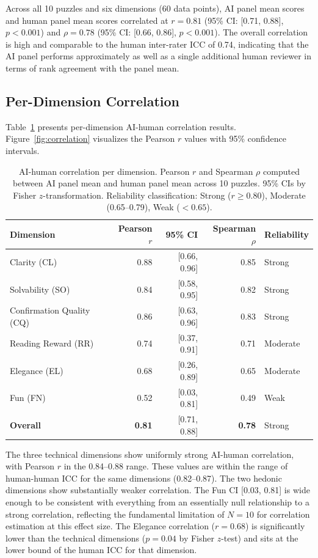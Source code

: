 Across all 10 puzzles and six dimensions (60 data points), AI panel mean scores and human panel mean scores correlated at $r = 0.81$ (95\% CI: [0.71, 0.88], $p < 0.001$) and $\rho = 0.78$ (95\% CI: [0.66, 0.86], $p < 0.001$). The overall correlation is high and comparable to the human inter-rater ICC of 0.74, indicating that the AI panel performs approximately as well as a single additional human reviewer in terms of rank agreement with the panel mean.

\subsection{Per-Dimension Correlation}

Table~\ref{tab:corr} presents per-dimension AI-human correlation results. Figure~\ref{fig:correlation} visualizes the Pearson $r$ values with 95\% confidence intervals.

\begin{table}[htbp]
\centering
\caption{AI-human correlation per dimension. Pearson $r$ and Spearman $\rho$ computed between AI panel mean and human panel mean across 10 puzzles. 95\% CIs by Fisher $z$-transformation. Reliability classification: Strong ($r \geq 0.80$), Moderate (0.65--0.79), Weak ($< 0.65$).}
\label{tab:corr}
\begin{tabular}{@{}lrrrl@{}}
\toprule
\textbf{Dimension} & \textbf{Pearson $r$} & \textbf{95\% CI} & \textbf{Spearman $\rho$} & \textbf{Reliability} \\
\midrule
Clarity (CL)              & 0.88 & [0.66, 0.96] & 0.85 & Strong   \\
Solvability (SO)          & 0.84 & [0.58, 0.95] & 0.82 & Strong   \\
Confirmation Quality (CQ) & 0.86 & [0.63, 0.96] & 0.83 & Strong   \\
Reading Reward (RR)       & 0.74 & [0.37, 0.91] & 0.71 & Moderate \\
Elegance (EL)             & 0.68 & [0.26, 0.89] & 0.65 & Moderate \\
Fun (FN)                  & 0.52 & [0.03, 0.81] & 0.49 & Weak     \\
\midrule
\textbf{Overall}          & \textbf{0.81} & [0.71, 0.88] & \textbf{0.78} & Strong \\
\bottomrule
\end{tabular}
\end{table}

The three technical dimensions show uniformly strong AI-human correlation, with Pearson $r$ in the 0.84--0.88 range. These values are within the range of human-human ICC for the same dimensions (0.82--0.87). The two hedonic dimensions show substantially weaker correlation. The Fun CI [0.03, 0.81] is wide enough to be consistent with everything from an essentially null relationship to a strong correlation, reflecting the fundamental limitation of $N=10$ for correlation estimation at this effect size. The Elegance correlation ($r=0.68$) is significantly lower than the technical dimensions ($p=0.04$ by Fisher $z$-test) and sits at the lower bound of the human ICC for that dimension.

